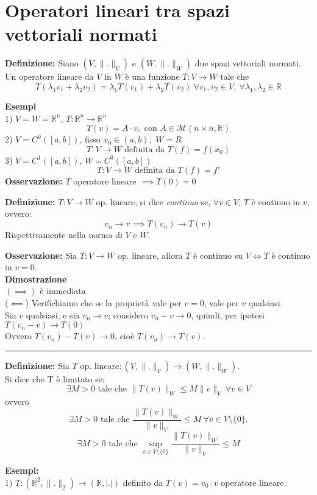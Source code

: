 \documentclass[a4paper]{article}
\newcommand{\R}{\mathbb{R}}
\newcommand{\divider}{\noindent\rule{\textwidth}{0.5pt}}
\begin{document}
\section{Operatori lineari tra spazi vettoriali normati}
\begin{tcolorbox}
\textbf{Definizione: }Siano $(V,\|.\|_V)$ e $(W,\|.\|_W)$ due spazi vettoriali normati.
\\Un operatore lineare da $V$ in $W$ è una funzione  $T:V\to W$ tale che
\[T(\lambda_1v_1+\lambda_2v_2)=\lambda_1T(v_1)+\lambda_2T(v_2) \ \forall v_1,v_2\in V,\  \forall \lambda_1,\lambda_2\in \R\]
\end{tcolorbox}
\textbf{Esempi} 
\\1) $V=W=\R^n$, $T:\R^n\to \R^n$ 
\[T(v)=A\cdot v,\text{ con }A\in \mathcal M (n\times n,\R)\]
2) $V=C^0([a,b])$, fisso $x_0\in (a,b),$ $W=R$
\[T:V\to W\text{ definita da }T(f)=f(x_0)\]
3) $V=C^1([a,b])$, $W=C^0([a,b])$
\[T:V \to W\text{ definita da }T(f)=f'\]
\textbf{Osservazione:} $T$ operatore lineare $\implies T(0)=0$
\begin{tcolorbox}
\textbf{Definizione: } $T:V\to W$ op. lineare, si dice \emph{continuo} se, $\forall v\in V$, $T$ è continuo in $v$, ovvero:
\[v_n \to v\implies T(v_n)\to T(v)\]
Rispettivamente nella norma di $V$ e $W$.
\end{tcolorbox}
\textbf{Osservazione: }Sia $T:V\to W$ op. lineare, allora $T$ è continuo su $V\iff T$ è continuo in $v=0$.
\\\textbf{Dimostrazione} 
\\$(\implies)$ è immediata 
\\($\impliedby$) Verifichiamo che se la proprietà vale per $v=0$, vale per $v$ qualsiasi.
\\Sia $v$ qualsiasi, e sia $v_n\to v$; considero $v_n-v\to 0$, quindi, per ipotesi $T(v_n-v)\to T(0)$
\\Ovvero $T(v_n)- T(v)\to 0$, cioè $T(v_n)\to T(v)$.
\\\divider
\begin{tcolorbox}
	\textbf{Definizione: } Sia $T$ op. lineare$:(V,\|.\|_V)\to (W,\|.\|_W)$.
	\\Si dice che T è limitato se:
	\[\exists  M>0\text{ tale che }\|T(v)\|_W\le M\|v\|_V\ \forall v\in V\]
	ovvero
	\[\exists  M>0 \text{ tale che } \frac{\|T(v)\|_W}{\|v\|_V}\le M\ \forall v\in V\setminus\{0\}.\]
	\[\exists  M>0 \text{ tale che } \sup_{v\in V\setminus \{0\} }\frac{\|T(v)\|_W}{\|v\|_V}\le M\]
\end{tcolorbox}
\textbf{Esempi:} 
\\1) $T:(\R^2,\|.\|_2)\to (\R,|.|)$ definito da $T(v)=v_0\cdot v$ operatore lineare.
\end{document}
